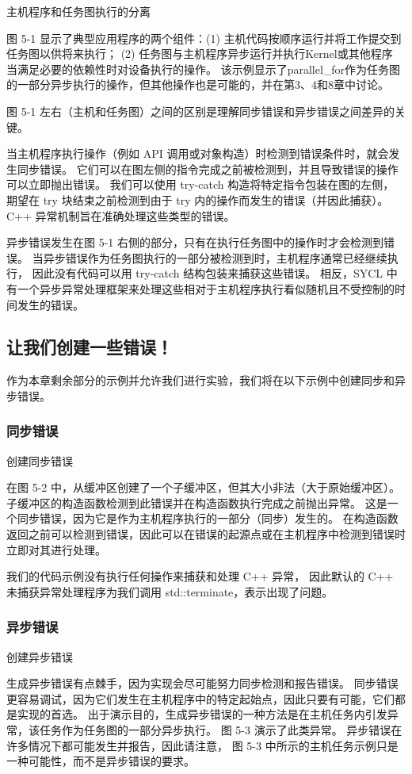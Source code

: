 {\color{red} 主机程序和任务图执行的分离}

图 5-1 显示了典型应用程序的两个组件：(1) 主机代码按顺序运行并将工作提交到任务图以供将来执行；
(2) 任务图与主机程序异步运行并执行Kernel或其他程序 当满足必要的依赖性时对设备执行的操作。 
该示例显示了parallel\_for作为任务图的一部分异步执行的操作，但其他操作也是可能的，并在第3、4和8章中讨论。

图 5-1 左右（主机和任务图）之间的区别是理解同步错误和异步错误之间差异的关键。

当主机程序执行操作（例如 API 调用或对象构造）时检测到错误条件时，就会发生同步错误。 
它们可以在图左侧的指令完成之前被检测到，并且导致错误的操作可以立即抛出错误。 
我们可以使用 try-catch 构造将特定指令包装在图的左侧，
期望在 try 块结束之前检测到由于 try 内的操作而发生的错误（并因此捕获）。 
C++ 异常机制旨在准确处理这些类型的错误。

异步错误发生在图 5-1 右侧的部分，只有在执行任务图中的操作时才会检测到错误。 
当异步错误作为任务图执行的一部分被检测到时，主机程序通常已经继续执行，
因此没有代码可以用 try-catch 结构包装来捕获这些错误。 
相反，SYCL 中有一个异步异常处理框架来处理这些相对于主机程序执行看似随机且不受控制的时间发生的错误。

\subsection{让我们创建一些错误！}
作为本章剩余部分的示例并允许我们进行实验，我们将在以下示例中创建同步和异步错误。

\subsubsection{同步错误}
{\color{red} 创建同步错误}

在图 5-2 中，从缓冲区创建了一个子缓冲区，但其大小非法（大于原始缓冲区）。 
子缓冲区的构造函数检测到此错误并在构造函数执行完成之前抛出异常。 
这是一个同步错误，因为它是作为主机程序执行的一部分（同步）发生的。 
在构造函数返回之前可以检测到错误，因此可以在错误的起源点或在主机程序中检测到错误时立即对其进行处理。

我们的代码示例没有执行任何操作来捕获和处理 C++ 异常，
因此默认的 C++ 未捕获异常处理程序为我们调用 std::terminate，表示出现了问题。

\subsubsection{异步错误}
{\color{red} 创建异步错误}

生成异步错误有点棘手，因为实现会尽可能努力同步检测和报告错误。 
同步错误更容易调试，因为它们发生在主机程序中的特定起始点，因此只要有可能，它们都是实现的首选。 
出于演示目的，生成异步错误的一种方法是在主机任务内引发异常，该任务作为任务图的一部分异步执行。 
图 5-3 演示了此类异常。 异步错误在许多情况下都可能发生并报告，因此请注意，
图 5-3 中所示的主机任务示例只是一种可能性，而不是异步错误的要求。

